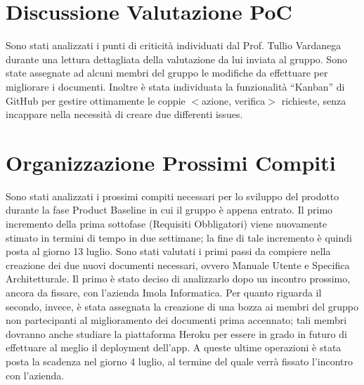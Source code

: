 \section{Discussione Valutazione PoC}
Sono stati analizzati i punti di criticità individuati dal Prof. Tullio Vardanega durante una lettura dettagliata della 
valutazione da lui inviata al gruppo. Sono state assegnate ad alcuni membri del gruppo le modifiche da effettuare per 
migliorare i documenti. Inoltre è stata individuata la funzionalità ``Kanban'' di GitHub per gestire ottimamente le 
coppie $<$azione, verifica$>$ richieste, senza incappare nella necessità di creare due differenti issues.

\section{Organizzazione Prossimi Compiti}
Sono stati analizzati i prossimi compiti necessari per lo sviluppo del prodotto durante la fase Product Baseline in cui 
il gruppo è appena entrato. Il primo incremento della prima sottofase (Requisiti Obbligatori) viene nuovamente stimato in 
termini di tempo in due settimane; la fine di tale incremento è quindi posta al giorno 13 luglio. 
Sono stati valutati i primi passi da compiere nella creazione dei due nuovi documenti necessari, ovvero Manuale Utente e 
Specifica Architetturale. Il primo è stato deciso di analizzarlo dopo un incontro prossimo, ancora da fissare, con 
l'azienda Imola Informatica. Per quanto riguarda il secondo, invece, è stata assegnata la creazione di una bozza ai 
membri del gruppo non partecipanti al miglioramento dei documenti prima accennato; tali membri dovranno anche studiare 
la piattaforma Heroku per essere in grado in futuro di effettuare al meglio il deployment dell'app. A queste ultime 
operazioni è stata posta la scadenza nel giorno 4 luglio, al termine del quale verrà fissato l'incontro con l'azienda.

\newpage